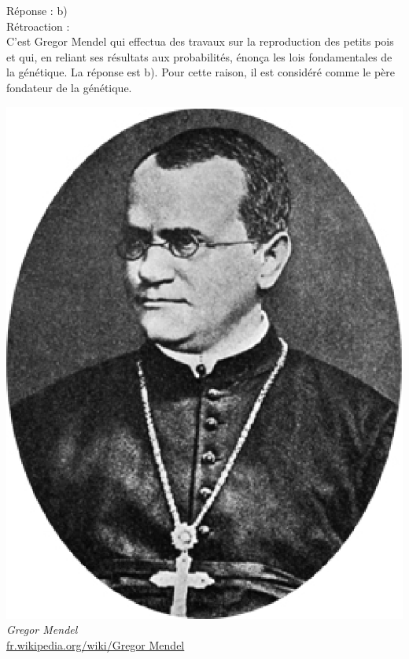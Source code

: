 \documentclass[letterpaper, 12pt]{article}
\begin{document}
R\'eponse : b)\\

R\'etroaction :\\
C'est Gregor Mendel qui effectua des travaux sur la reproduction des petits pois et qui, en reliant ses r\'esultats aux probabilit\'es, \'enon\c ca les lois fondamentales de la g\'en\'etique. La r\'eponse est b). Pour cette raison, il est consid\'er\'e comme le p\`ere fondateur de la g\'en\'etique.
\begin{center}
\includegraphics[scale=0.4]{Mendel.eps}\\
\emph{{\small Gregor Mendel}}\\
\href{http://fr.wikipedia.org/wiki/Gregor_Mendel}{fr.wikipedia.org/wiki/Gregor Mendel}\\[5mm]
\end{center}
\end{document}
